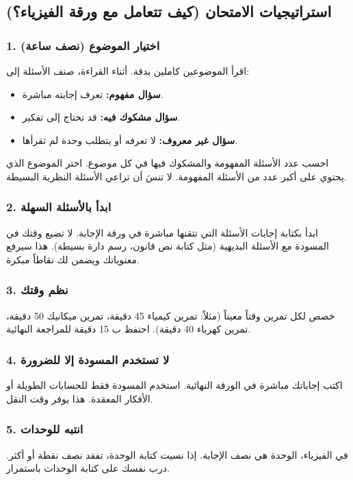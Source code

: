 \documentclass[12pt,a4paper]{book}
\begin{document}
	\subsection{استراتيجيات الامتحان (كيف تتعامل مع ورقة الفيزياء؟)}
	
	\subsubsection*{1. اختيار الموضوع (نصف ساعة)}
	اقرأ الموضوعين كاملين بدقة. أثناء القراءة، صنف الأسئلة إلى:
	\begin{itemize}
		\item \textbf{سؤال مفهوم:} تعرف إجابته مباشرة.
		\item \textbf{سؤال مشكوك فيه:} قد تحتاج إلى تفكير.
		\item \textbf{سؤال غير معروف:} لا تعرفه أو يتطلب وحدة لم تقرأها.
	\end{itemize}
	احسب عدد الأسئلة المفهومة والمشكوك فيها في كل موضوع. اختر الموضوع الذي يحتوي على أكبر عدد من الأسئلة المفهومة. لا تنسَ أن تراعي الأسئلة النظرية البسيطة.
	
	\subsubsection*{2. ابدأ بالأسئلة السهلة}
	ابدأ بكتابة إجابات الأسئلة التي تتقنها مباشرة في ورقة الإجابة. لا تضيع وقتك في المسودة مع الأسئلة البديهية (مثل كتابة نص قانون، رسم دارة بسيطة). هذا سيرفع معنوياتك ويضمن لك نقاطاً مبكرة.
	
	\subsubsection*{3. نظم وقتك}
	خصص لكل تمرين وقتاً معيناً (مثلاً: تمرين كيمياء 45 دقيقة، تمرين ميكانيك 50 دقيقة، تمرين كهرباء 40 دقيقة). احتفظ ب 15 دقيقة للمراجعة النهائية.
	
	\subsubsection*{4. لا تستخدم المسودة إلا للضرورة}
	اكتب إجاباتك مباشرة في الورقة النهائية. استخدم المسودة فقط للحسابات الطويلة أو الأفكار المعقدة. هذا يوفر وقت النقل.
	
	\subsubsection*{5. انتبه للوحدات}
	في الفيزياء، الوحدة هي نصف الإجابة. إذا نسيت كتابة الوحدة، تفقد نصف نقطة أو أكثر. درب نفسك على كتابة الوحدات باستمرار.
	
\end{document}
